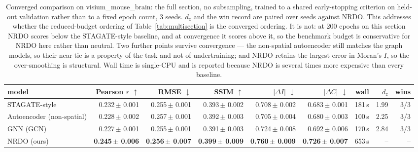 \begin{table}[htbp]
\centering
\footnotesize
\setlength{\tabcolsep}{3pt}
\caption{Converged comparison on visium\_mouse\_brain: the full section, no subsampling, trained to a shared early-stopping criterion on held-out validation rather than to a fixed epoch count, 3 seeds. $d_z$ and the win record are paired over seeds against NRDO. This addresses whether the reduced-budget ordering of Table~\ref{tab:multisection} is the converged ordering. It is not: at 200 epochs on this section NRDO scores below the STAGATE-style baseline, and at convergence it scores above it, so the benchmark budget is conservative for NRDO here rather than neutral. Two further points survive convergence --- the non-spatial autoencoder still matches the graph models, so their near-tie is a property of the task and not of undertraining; and NRDO retains the largest error in Moran's $I$, so the over-smoothing is structural. Wall time is single-CPU and is reported because NRDO is several times more expensive than every baseline.}
\label{tab:converged}
\begin{tabular}{lrrrrrrrr}
\toprule
model & Pearson $r$ $\uparrow$ & RMSE $\downarrow$ & SSIM $\uparrow$ & $|\Delta I|$ $\downarrow$ & $|\Delta C|$ $\downarrow$ & wall & $d_z$ & wins\\
\midrule
STAGATE-style & 0.232\,\tiny{$\pm$ 0.001} & 0.255\,\tiny{$\pm$ 0.001} & 0.393\,\tiny{$\pm$ 0.002} & 0.708\,\tiny{$\pm$ 0.002} & 0.683\,\tiny{$\pm$ 0.001} & 181\,s & 1.99 & 3/3 \\
Autoencoder (non-spatial) & 0.228\,\tiny{$\pm$ 0.002} & 0.257\,\tiny{$\pm$ 0.001} & 0.392\,\tiny{$\pm$ 0.003} & 0.705\,\tiny{$\pm$ 0.004} & 0.680\,\tiny{$\pm$ 0.003} & 100\,s & 2.25 & 3/3 \\
GNN (GCN) & 0.227\,\tiny{$\pm$ 0.001} & 0.255\,\tiny{$\pm$ 0.001} & 0.391\,\tiny{$\pm$ 0.003} & 0.724\,\tiny{$\pm$ 0.008} & 0.692\,\tiny{$\pm$ 0.006} & 170\,s & 2.84 & 3/3 \\
\midrule
NRDO (ours) & \textbf{0.245\,\tiny{$\pm$ 0.006}} & \textbf{0.256\,\tiny{$\pm$ 0.007}} & \textbf{0.399\,\tiny{$\pm$ 0.009}} & \textbf{0.760\,\tiny{$\pm$ 0.009}} & \textbf{0.726\,\tiny{$\pm$ 0.007}} & 653\,s & -- & -- \\
\bottomrule
\end{tabular}
\end{table}
